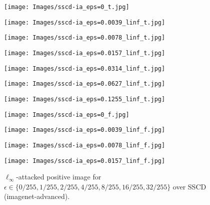 \documentclass[12pt]{article}
\begin{document}
\begin{figure}[ht]
  \centering
  \begin{minipage}{0.125\textwidth}
    \texttt{[image: Images/sscd-ia\_eps=0\_t.jpg]}
  \end{minipage}
  \hfill
  \begin{minipage}{0.125\textwidth}
    \texttt{[image: Images/sscd-ia\_eps=0.0039\_linf\_t.jpg]}
  \end{minipage}
  \hfill
  \begin{minipage}{0.125\textwidth}
    \texttt{[image: Images/sscd-ia\_eps=0.0078\_linf\_t.jpg]}
  \end{minipage}
  \hfill
  \begin{minipage}{0.125\textwidth}
    \texttt{[image: Images/sscd-ia\_eps=0.0157\_linf\_t.jpg]}
  \end{minipage}
  \hfill
  \begin{minipage}{0.125\textwidth}
    \texttt{[image: Images/sscd-ia\_eps=0.0314\_linf\_t.jpg]}
  \end{minipage}
  \hfill
  \begin{minipage}{0.125\textwidth}
    \texttt{[image: Images/sscd-ia\_eps=0.0627\_linf\_t.jpg]}
  \end{minipage}
  \hfill
  \begin{minipage}{0.125\textwidth}
    \texttt{[image: Images/sscd-ia\_eps=0.1255\_linf\_t.jpg]}
  \end{minipage}
  \label{fig:sscd_linf_positive_examples}
  \caption{$\ell_\infty$-attacked positive image for $\epsilon \in \{0/255, 1/255, 2/255, 4/255, 8/255, 16/255, 32/255\}$ over SSCD (imagenet-advanced).}
  \vspace{10pt}
  \begin{minipage}{0.125\textwidth}
    \texttt{[image: Images/sscd-ia\_eps=0\_f.jpg]}
  \end{minipage}
  \hfill
  \begin{minipage}{0.125\textwidth}
    \texttt{[image: Images/sscd-ia\_eps=0.0039\_linf\_f.jpg]}
  \end{minipage}
  \hfill
  \begin{minipage}{0.125\textwidth}
    \texttt{[image: Images/sscd-ia\_eps=0.0078\_linf\_f.jpg]}
  \end{minipage}
  \hfill
  \begin{minipage}{0.125\textwidth}
    \texttt{[image: Images/sscd-ia\_eps=0.0157\_linf\_f.jpg]}
  \end{minipage}

\end{figure}
\end{document}
